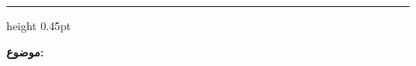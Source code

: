 \documentclass[12pt,a4paper]{article}
\begin{document}
\FaOptionalOpening
\begin{center}
  \FaOptionalLogo
  \ifdefempty{\SenderLogoFa}{}{\\[3pt]}
  \FaOrganizationLine
  {\large\bfseries\SenderNameFa}\\[3pt]
  {\small\SenderRoleFa}%
  \FaIfContactTF{\\[2pt]{\small\FaContactLine}}{}
\end{center}
\vspace{2mm}
\hrule height 0.45pt
\vspace{7mm}

\begin{flushleft}\FaAdminDetails\end{flushleft}
\vspace{3mm}
\FaRecipientDetails

\vspace{3mm}
\textbf{موضوع: \LetterSubjectFa}

\vspace{4mm}
\LetterGreetingFa

\par
{}
\begin{samepage}
\par
\vspace{5mm}
\FaClosingBlock
\end{samepage}
\end{document}
